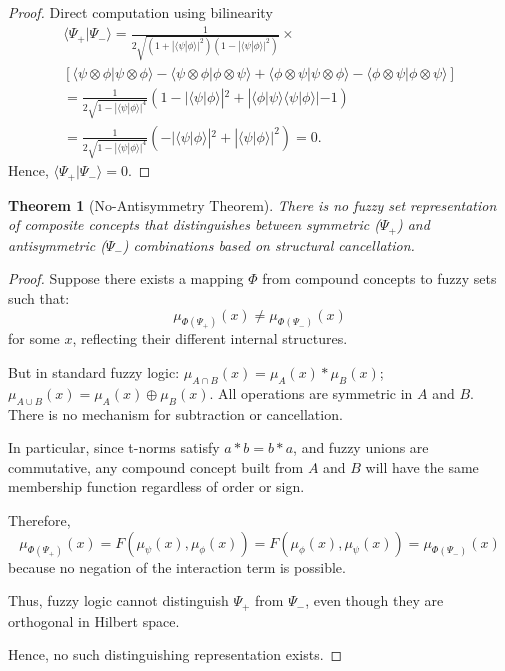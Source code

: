 \documentclass{article}
\newtheorem{theorem}{Theorem}
\begin{document}
\begin{proof}
Direct computation using bilinearity
\begin{gather*}
\langle \Psi_+ | \Psi_- \rangle 
= \frac{1}{2\sqrt{(1 + |\langle\psi|\phi\rangle|^2)(1 - |\langle\psi|\phi\rangle|^2)}} \times \\
\left[
\langle\psi\otimes\phi|\psi\otimes\phi\rangle 
- \langle\psi\otimes\phi|\phi\otimes\psi\rangle 
+ \langle\phi\otimes\psi|\psi\otimes\phi\rangle 
- \langle\phi\otimes\psi|\phi\otimes\psi\rangle
\right] \\
= \frac{1}{2\sqrt{1 - |\langle\psi|\phi\rangle|^4}} 
\left(1 - |\langle\psi|\phi\rangle|^2 + |\langle\phi|\psi\rangle\langle\psi|\phi\rangle| - 1\right) \\
= \frac{1}{2\sqrt{1 - |\langle\psi|\phi\rangle|^4}} 
\left(- |\langle\psi|\phi\rangle|^2 + |\langle\psi|\phi\rangle|^2\right) = 0 .
\end{gather*}
Hence, $\langle \Psi_+ | \Psi_- \rangle = 0$.
\end{proof}

\begin{theorem}[No-Antisymmetry Theorem]
There is no fuzzy set representation of composite concepts that distinguishes between symmetric ($\Psi_+$) and antisymmetric ($\Psi_-$) combinations based on structural cancellation.
\end{theorem}

\begin{proof}
Suppose there exists a mapping $\Phi$ from compound concepts to fuzzy sets such that:
$$
\mu_{\Phi(\Psi_+)}(x) \neq \mu_{\Phi(\Psi_-)}(x)
$$
for some $x$, reflecting their different internal structures.

But in standard fuzzy logic:
$\mu_{A \cap B}(x) = \mu_A(x) * \mu_B(x)$;
$\mu_{A \cup B}(x) = \mu_A(x) \oplus \mu_B(x)$.
All operations are symmetric in $A$ and $B$.
There is no mechanism for subtraction or cancellation.

In particular, since t-norms satisfy $a * b = b * a$, and fuzzy unions are commutative, any compound concept built from $A$ and $B$ will have the same membership function regardless of order or sign.

Therefore,
$$
\mu_{\Phi(\Psi_+)}(x) = F(\mu_\psi(x), \mu_\phi(x)) = F(\mu_\phi(x), \mu_\psi(x)) = \mu_{\Phi(\Psi_-)}(x)
$$
because no negation of the interaction term is possible.

Thus, fuzzy logic cannot distinguish $\Psi_+$ from $\Psi_-$, even though they are orthogonal in Hilbert space.

Hence, no such distinguishing representation exists.
\end{proof}
\end{document}
